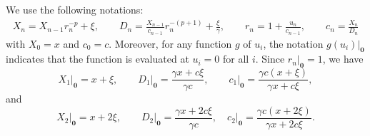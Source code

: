 \documentclass[11pt]{article}
\theoremstyle{definition}
\begin{document}
We use the following notations:
\begin{align}
	X_n = X_{n-1} r_{n}^{-p} + \xi, \qquad D_n = \frac{X_{n-1}}{c_{n-1}}r_n^{-(p+1)}+\frac{\xi}{\gamma}, \qquad r_n = 1 + \frac{u_n}{c_{n-1}}, \qquad c_n = \frac{X_n}{D_n}
\end{align}
with $X_0 = x$ and $c_0 = c$.
Moreover, for any function $g$ of $u_i$, the notation $\left. g(u_i) \right|_{\mathbf{0}}$ indicates that the function is evaluated at $u_i = 0$ for all $i$.
Since $\left. r_n \right|_{\mathbf{0}}=1$, we have
\begin{equation}
	\left. X_1 \right|_{\mathbf{0}} = x + \xi,  \qquad
	\left. D_1 \right|_{\mathbf{0}} = \frac{\gamma x + c \xi}{\gamma c}, \qquad \left. c_1 \right|_{\mathbf{0}} = \frac{\gamma c(x + \xi)}{\gamma x + c \xi}, \label{Eq:1_0}
\end{equation}
and
\begin{equation}
\left. X_2 \right|_{\mathbf{0}} = x + 2 \xi,\qquad \left. D_2 \right|_{\mathbf{0}} = \frac{\gamma x + 2 c \xi}{\gamma c}, \quad \left. c_2 \right|_{\mathbf{0}} = \frac{\gamma c(x + 2\xi)}{\gamma x + 2 c \xi}. 
\label{Eq:2_0}
\end{equation}
\end{document}
